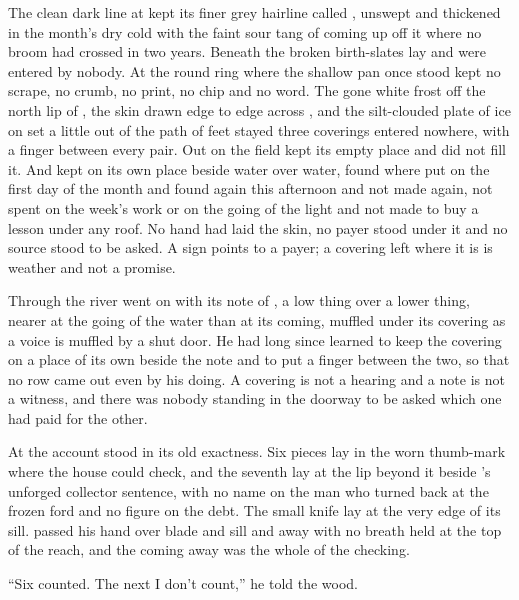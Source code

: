 The clean dark line at  kept its finer grey hairline called , unswept and thickened in the month's dry cold with the faint sour tang of  coming up off it where no broom had crossed in two years. Beneath  the broken birth-slates lay and were entered by nobody. At  the round ring where the shallow pan once stood kept no scrape, no crumb, no print, no chip and no word. The gone white frost off the north lip of , the skin drawn edge to edge across , and the silt-clouded plate of ice on  set a little out of the path of feet stayed three coverings entered nowhere, with a finger between every pair. Out on  the field kept its empty place and did not fill it. And  kept  on its own place beside water over water, found where put on the first day of the month and found again this afternoon and not made again, not spent on the week's work or on the going of the light and not made to buy a lesson under any roof. No hand had laid the skin, no payer stood under it and no source stood to be asked. A sign points to a payer; a covering left where it is is weather and not a promise.

Through  the river went on with its note of , a low thing over a lower thing, nearer at the going of the water than at its coming, muffled under its covering as a voice is muffled by a shut door. He had long since learned to keep the covering on a place of its own beside the note and to put a finger between the two, so that no row came out even by his doing. A covering is not a hearing and a note is not a witness, and there was nobody standing in the doorway to be asked which one had paid for the other.

\scenebreak

At  the account stood in its old exactness. Six pieces lay in the worn thumb-mark where the house could check, and the seventh lay at the lip beyond it beside 's unforged collector sentence, with no name on the man who turned back at the frozen ford and no figure on the debt. The small knife lay at the very edge of its sill.  passed his hand over blade and sill and away with no breath held at the top of the reach, and the coming away was the whole of the checking.

“Six counted. The next I don't count,” he told the wood.

